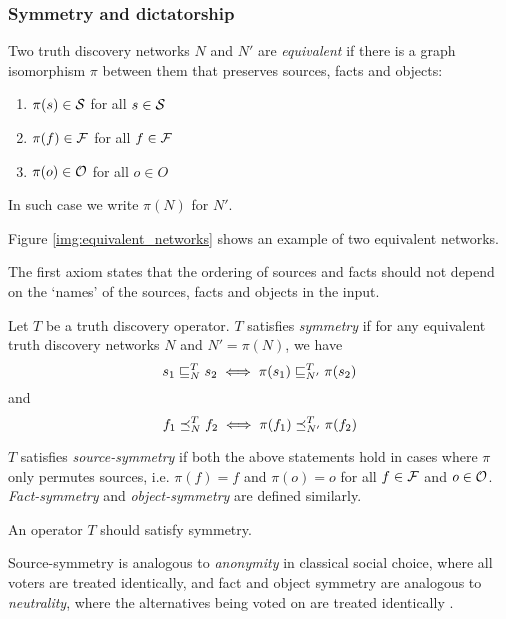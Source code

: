 \documentclass[../main.tex]{subfiles}
\begin{document}

\subsubsection{Symmetry and dictatorship}

\begin{definition}
Two truth discovery networks $N$ and $N'$ are \emph{equivalent} if there is a
graph isomorphism $\pi$ between them that preserves sources, facts and objects:
\begin{enumerate}
\item $\pi(s) \in \S$ for all $s \in \S$
\item $\pi(f) \in \F$ for all $f \in \F$
\item $\pi(o) \in \O$ for all $o \in O$
\end{enumerate}

In such case we write $\pi(N)$ for $N'$.
\end{definition}

Figure \ref{img:equivalent_networks} shows an example of two equivalent
networks.

The first axiom states that the ordering of sources and facts should not depend
on the `names' of the sources, facts and objects in the input.

\begin{definition}
Let $T$ be a truth discovery operator. $T$ satisfies \emph{symmetry} if for
any equivalent truth discovery networks $N$ and $N' = \pi(N)$, we have
$$ s_1 \sle_N^T s_2 \iff \pi(s_1) \sle_{N'}^T \pi(s_2) $$
and
$$ f_1 \fle_N^T f_2 \iff \pi(f_1) \fle_{N'}^T \pi(f_2) $$

$T$ satisfies \emph{source-symmetry} if both the above statements hold in cases
where $\pi$ only permutes sources, i.e. $\pi(f)=f$ and $\pi(o)=o$ for all $f
\in \F$ and $o \in \O$. \emph{Fact-symmetry} and \emph{object-symmetry} are
defined similarly.
\end{definition}

\begin{axiom}[Symmetry]
\label{axiom:symm}
An operator $T$ should satisfy symmetry.
\end{axiom}

Source-symmetry is analogous to \emph{anonymity} in classical social choice,
where all voters are treated identically, and fact and object symmetry are
analogous to \emph{neutrality}, where the alternatives being
voted on are treated identically \cite{handbook_voting}.
\end{document}
